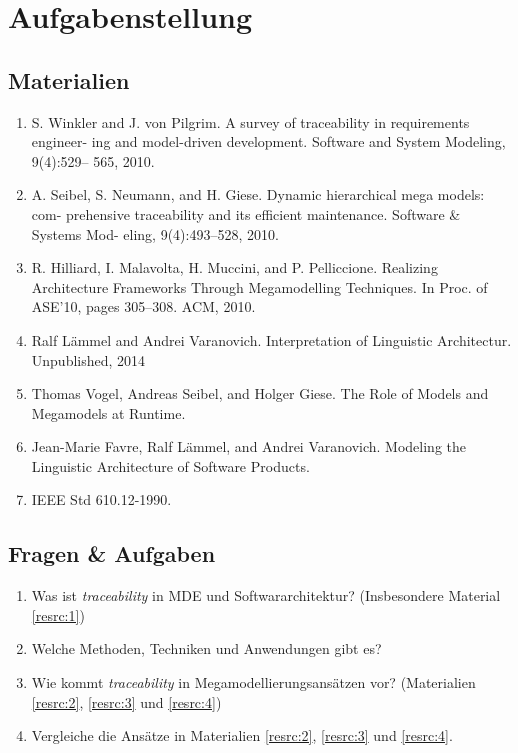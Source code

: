\section{Aufgabenstellung}

\subsection{Materialien}
\begin{enumerate}

\item
\label{resrc:1}
S. Winkler and J. von Pilgrim. A survey of traceability in requirements engineer- ing and model-driven development. Software and System Modeling, 9(4):529– 565, 2010. 

\item
\label{resrc:2}
A. Seibel, S. Neumann, and H. Giese. Dynamic hierarchical mega models: com- prehensive traceability and its efficient maintenance. Software \& Systems Mod- eling, 9(4):493–528, 2010.

\item
\label{resrc:3}
R. Hilliard, I. Malavolta, H. Muccini, and P. Pelliccione. Realizing Architecture Frameworks Through Megamodelling Techniques. In Proc. of ASE’10, pages 305–308. ACM, 2010.

\item
\label{resrc:4}
Ralf Lämmel and Andrei Varanovich. Interpretation of Linguistic Architectur. Unpublished, 2014

\item
\label{resrc:5}
Thomas Vogel, Andreas Seibel, and Holger Giese. The Role of Models and Megamodels at Runtime.

\item
\label{resrc:6}
Jean-Marie Favre, Ralf Lämmel, and Andrei Varanovich. Modeling the Linguistic Architecture of Software Products.

\item
\label{resrc:7}
IEEE Std 610.12-1990.

\end{enumerate}

\subsection{Fragen \& Aufgaben}
\begin{enumerate}

\item
Was ist \textit{traceability} in MDE und Softwararchitektur? (Insbesondere Material \ref{resrc:1})

\item
Welche Methoden, Techniken und Anwendungen gibt es? 

\item
Wie kommt \textit{traceability} in Megamodellierungsansätzen vor? (Materialien \ref{resrc:2}, \ref{resrc:3} und \ref{resrc:4})

\item 
Vergleiche die Ansätze in Materialien \ref{resrc:2}, \ref{resrc:3} und \ref{resrc:4}.

\end{enumerate}